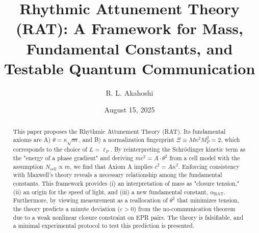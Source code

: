 \documentclass[11pt,a4paper]{article}
\title{Rhythmic Attunement Theory (RAT): A Framework for Mass, Fundamental Constants, and Testable Quantum Communication}
\author{R. L. Akahoshi}
\affil{Independent Researcher, Tokyo, Japan \\ \href{mailto:r.l.akahoshi@gmail.com}{\texttt{r.l.akahoshi@gmail.com}}}
\date{August 15, 2025}
\newcommand{\rat}{\mathrm{RAT}}
\newcommand{\lp}{\ell_P}
\newcommand{\ar}{\alpha_{\rat}}
\newcommand{\kappaR}{\kappa}
\begin{document}
\maketitle

\begin{abstract}
\noindent
This paper proposes the Rhythmic Attunement Theory (RAT). Its fundamental axioms are A) $\theta=\kappaR\sqrt{m}$, and B) a normalization fingerprint $\Xi \equiv M\kappaR^2 M_P^2 = 2$, which corresponds to the choice of $L=\lp$. By reinterpreting the Schrödinger kinetic term as the "energy of a phase gradient" and deriving $mc^2=A\cdot\theta^2$ from a cell model with the assumption $N_{\text{cell}}\propto m$, we find that Axiom A implies $c^2=A\kappaR^2$. Enforcing consistency with Maxwell's theory reveals a necessary relationship among the fundamental constants. This framework provides (i) an interpretation of mass as "closure tension," (ii) an origin for the speed of light, and (iii) a new fundamental constant, $\ar$. Furthermore, by viewing measurement as a reallocation of $\theta^2$ that minimizes tension, the theory predicts a minute deviation ($\varepsilon>0$) from the no-communication theorem due to a weak nonlinear closure constraint on EPR pairs. The theory is falsifiable, and a minimal experimental protocol to test this prediction is presented.
\end{abstract}
\end{document}
